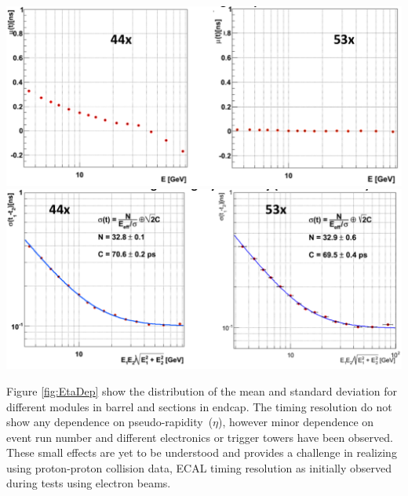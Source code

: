 \begin{center}
\centering
\mbox{\includegraphics[scale=0.45]{THESISPLOTS/AmplitudeVsTimeCMSSW_Comparison.png}}
\vspace{4cm}
\mbox{\includegraphics[scale=0.46]{THESISPLOTS/TimingResolutionCMSSW_Comparison.png}}
\label{fig:TimeBias}
\end{center}

Figure \ref{fig:EtaDep} show the distribution of the mean and standard deviation for different modules in barrel and sections in endcap. The timing resolution do not show any dependence on pseudo-rapidity~($\eta$), however minor dependence on event run number and different electronics or trigger towers have been observed. These small effects are yet to be understood and provides a challenge in realizing using proton-proton collision data, ECAL timing resolution as initially observed during tests using electron beams.

